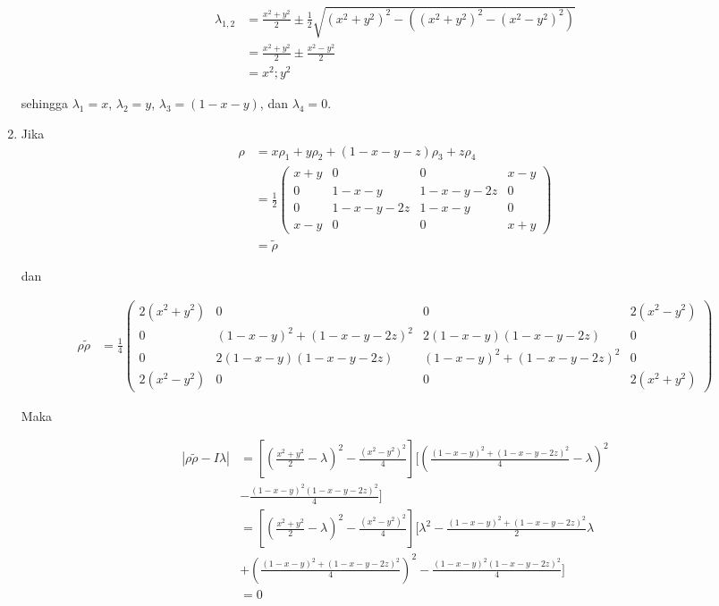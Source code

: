 \begin{enumerate}
	\begin{equation}
		\begin{aligned}
			\lambda_{1,2}
			&=\frac{x^2+y^2}{2}\pm\frac{1}{2}\sqrt{(x^2+y^2)^2-((x^2+y^2)^2-(x^2-y^2)^2)}\\
			&=\frac{x^2+y^2}{2}\pm\frac{x^2-y^2}{2}\\
			&=x^2; y^2
		\end{aligned}
	\end{equation}
	
	sehingga $\lambda_1=x$, $\lambda_2=y$, $\lambda_3=(1-x-y)$, dan $\lambda_4=0$.
	
	\item Jika
	\begin{equation}
		\begin{aligned}
			\rho
			&=x\rho_1+y\rho_2+(1-x-y-z)\rho_3+z\rho_4\\
			&=\frac{1}{2}
			\begin{pmatrix}
				x+y&0&0&x-y\\
				0&1-x-y&1-x-y-2z&0\\
				0&1-x-y-2z&1-x-y&0\\
				x-y&0&0&x+y
			\end{pmatrix}\\
			&=\tilde{\rho}
		\end{aligned}
	\end{equation}
	
	dan
	
	\begin{equation}
		\begin{aligned}
			\rho \tilde{\rho}
			&=\frac{1}{4}
			\begin{pmatrix}
				2(x^2+y^2)&0&0&2(x^2-y^2)\\
				0&(1-x-y)^2+(1-x-y-2z)^2&2(1-x-y)(1-x-y-2z)&0\\
				0&2(1-x-y)(1-x-y-2z)&(1-x-y)^2+(1-x-y-2z)^2&0\\
				2(x^2-y^2)&0&0&2(x^2+y^2)
			\end{pmatrix}
		\end{aligned}
	\end{equation}
	
	Maka
	
	\begin{equation}
		\begin{aligned}
			|\rho \tilde{\rho}-I\lambda|
			&=[(\frac{x^2+y^2}{2}-\lambda)^2-\frac{(x^2-y^2)^2}{4}][(\frac{(1-x-y)^2+(1-x-y-2z)^2}{4}-\lambda)^2\\
			&-\frac{(1-x-y)^2(1-x-y-2z)^2}{4}]\\
			&=[(\frac{x^2+y^2}{2}-\lambda)^2-\frac{(x^2-y^2)^2}{4}][\lambda^2-\frac{(1-x-y)^2+(1-x-y-2z)^2}{2}\lambda\\
			&+(\frac{(1-x-y)^2+(1-x-y-2z)^2}{4})^2-\frac{(1-x-y)^2(1-x-y-2z)^2}{4}]\\
			&=0
		\end{aligned}
	\end{equation}
	

\end{enumerate}
